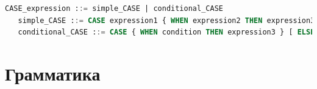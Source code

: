 \begin{lstlisting}[language=sql, label=some-code, caption=Спецификация SQL запроса]
   CASE_expression ::= simple_CASE | conditional_CASE
   simple_CASE ::= CASE expression1 { WHEN expression2 THEN expression3 } [ ELSE expression4 ] END
   conditional_CASE ::= CASE { WHEN condition THEN expression3 } [ ELSE expression4 ] END
\end{lstlisting}

\section{Грамматика}


